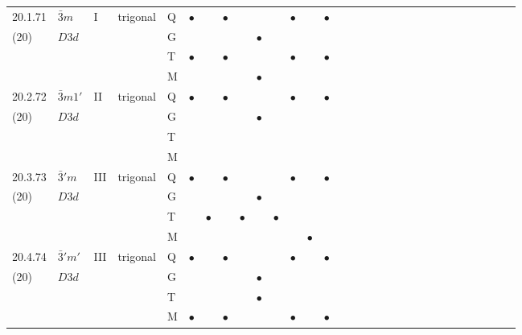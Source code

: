 \documentclass[fleqn,9pt,landscape]{jsarticle}
\begin{document}
\begin{longtable}{lllll|l|l|l|l|l|l|l|l|l|ll|ll|ll|ll|ll|ll|ll|ll}
20.1.71 & \texttt{$\bar{3}m$} & I & trigonal & Q & $\bullet$ &  & $\bullet$ &  &  &  & $\bullet$ &  & $\bullet$ &  &  &  &  &  &  &  &  &  &  &  &  &  &  &  &  \\
(20) & $D3d$ &  &  & G &  &  &  &  & $\bullet$ &  &  &  &  &  &  &  &  &  &  &  &  &  &  &  &  &  &  &  &  \\
 &  &  &  & T & $\bullet$ &  & $\bullet$ &  &  &  & $\bullet$ &  & $\bullet$ &  &  &  &  &  &  &  &  &  &  &  &  &  &  &  &  \\
 &  &  &  & M &  &  &  &  & $\bullet$ &  &  &  &  &  &  &  &  &  &  &  &  &  &  &  &  &  &  &  &  \\ \hline
20.2.72 & \texttt{$\bar{3}m1'$} & II & trigonal & Q & $\bullet$ &  & $\bullet$ &  &  &  & $\bullet$ &  & $\bullet$ &  &  &  &  &  &  &  &  &  &  &  &  &  &  &  &  \\
(20) & $D3d$ &  &  & G &  &  &  &  & $\bullet$ &  &  &  &  &  &  &  &  &  &  &  &  &  &  &  &  &  &  &  &  \\
 &  &  &  & T &  &  &  &  &  &  &  &  &  &  &  &  &  &  &  &  &  &  &  &  &  &  &  &  &  \\
 &  &  &  & M &  &  &  &  &  &  &  &  &  &  &  &  &  &  &  &  &  &  &  &  &  &  &  &  &  \\ \hline
20.3.73 & \texttt{$\bar{3}'m$} & III & trigonal & Q & $\bullet$ &  & $\bullet$ &  &  &  & $\bullet$ &  & $\bullet$ &  &  &  &  &  &  &  &  &  &  &  &  &  &  &  &  \\
(20) & $D3d$ &  &  & G &  &  &  &  & $\bullet$ &  &  &  &  &  &  &  &  &  &  &  &  &  &  &  &  &  &  &  &  \\
 &  &  &  & T &  & $\bullet$ &  & $\bullet$ &  & $\bullet$ &  &  &  &  &  &  &  &  &  &  &  &  &  &  &  &  &  &  &  \\
 &  &  &  & M &  &  &  &  &  &  &  & $\bullet$ &  &  &  &  &  &  &  &  &  &  &  &  &  &  &  &  &  \\ \hline
20.4.74 & \texttt{$\bar{3}'m'$} & III & trigonal & Q & $\bullet$ &  & $\bullet$ &  &  &  & $\bullet$ &  & $\bullet$ &  &  &  &  &  &  &  &  &  &  &  &  &  &  &  &  \\
(20) & $D3d$ &  &  & G &  &  &  &  & $\bullet$ &  &  &  &  &  &  &  &  &  &  &  &  &  &  &  &  &  &  &  &  \\
 &  &  &  & T &  &  &  &  & $\bullet$ &  &  &  &  &  &  &  &  &  &  &  &  &  &  &  &  &  &  &  &  \\
 &  &  &  & M & $\bullet$ &  & $\bullet$ &  &  &  & $\bullet$ &  & $\bullet$ &  &  &  &  &  &  &  &  &  &  &  &  &  &  &  &  \\ \hline

\end{longtable}
\end{document}
